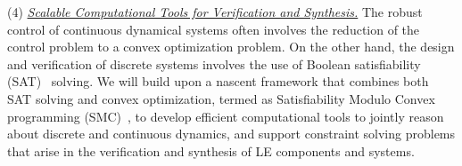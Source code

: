 \documentclass[10pt]{dod-blank}
\begin{document}
(4) \underline{\textit{Scalable Computational Tools for Verification and Synthesis.}} The robust control of continuous dynamical systems often involves the reduction of the control problem to a convex optimization problem. On the other hand, the design and verification of discrete systems involves the use of Boolean satisfiability (SAT)~\cite{Malik09} solving. We will build upon a nascent framework that combines both SAT solving and convex optimization, termed as Satisfiability Modulo Convex programming (SMC)~\cite{Shoukry2017}, to develop efficient computational tools to jointly reason about discrete and continuous dynamics,  and support constraint solving problems that arise in the verification and synthesis of LE components and systems.  
\end{document}
